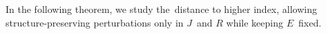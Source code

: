 \documentclass[11pt]{article}
\newcommand{\C}{\mathbb C}
\begin{document}


 In the following theorem, we study the distance to higher index, allowing structure-preserving perturbations only in $J$ and $R$ while keeping $E$ fixed.
\end{document}
